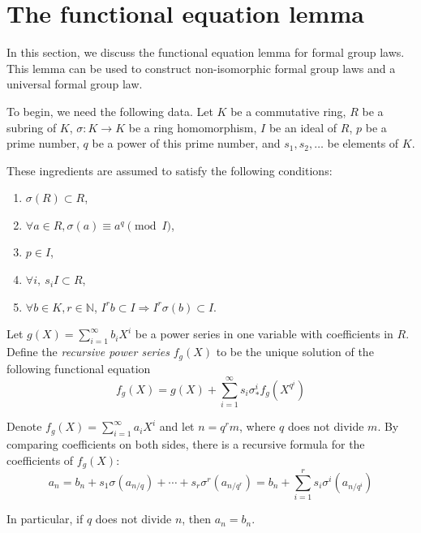 \section{The functional equation lemma}

In this section, we discuss the functional equation lemma for formal group laws. This lemma
can be used to construct non-isomorphic formal group laws and a universal
formal group law. \par

To begin, we need the following data. Let $K$ be a commutative ring, $R$ be a subring of $K$,
$\sigma : K \to K$ be a
ring homomorphism, $I$ be an ideal of $R$, $p$ be a prime number, $q$ be a power of this prime
number, and $s_1, s_2, \ldots $ be elements of $K$. \par
These ingredients are assumed to satisfy the following conditions:

\begin{enumerate}
    \item $\sigma (R) \subset R$,
    \item $\forall a \in R, \sigma (a) \equiv a ^ q \pmod{I}$, \label{property : frobenius}
    \item $p \in I$,
    \item $\forall i, \ s_i I \subset R$, \label{property 4}
    \item $\forall b \in K, r \in \mathbb{N}$, $I ^ r b \subset I \Rightarrow I ^ r \sigma (b) \subset I$.
        \label{condition: I_pow subset}
\end{enumerate}

\begin{definition}
Let $g (X) = \sum_{i = 1}^\infty b_i X ^ i $ be a power series in one variable with coefficients
in $R$. Define the \emph{recursive power series} $f_g(X)$ to be the unique solution of the following
functional equation
\begin{equation}
    f_g(X)= g(X)+ \sum_{i = 1}^\infty s_i \sigma_*^i f_g (X^{q ^ i})
    \label{equation: recurFunEq}
\end{equation}
\end{definition}

\begin{remark}
    Denote $f_g(X) = \sum _{i = 1} ^ \infty a _i X ^ i$ and let $n = q ^ r m$, where
    $q$ does not divide $m$.
    By comparing coefficients on both sides, there is a recursive formula for the
    coefficients of $f_g(X)$:
    \begin{equation}
        a _n = b _n + s_1 \sigma(a_{n/ q}) + \cdots + s _r \sigma^ r(a _{n / q ^ r}) =
        b_n + \sum_ {i = 1} ^ r s_i \sigma^i (a _ {n / q ^ i})
        \label{eq: coeff_RecurFun}
    \end{equation}

    In particular, if $q$ does not divide $n$, then $a_n = b _n$.
\end{remark}

